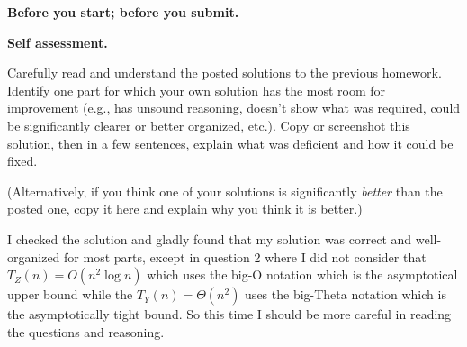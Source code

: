\documentclass[11pt,addpoints]{exam}
\begin{document}
\listoffixmes

\hwpreface

\pointsinmargin
{}
\marginpointname{ \points}
\marginbonuspointname{ \bonuspoints}

\begin{questions}
  \addtocounter{question}{-1}
  \question[0] \textbf{Before you start; before you submit.}
  

  \question[10] \textbf{Self assessment.}

  Carefully read and understand the posted solutions to the previous homework.
  Identify one part for which your own solution has the most room for improvement (e.g., has unsound reasoning, doesn’t show what was required, could be significantly clearer or better organized, etc.).
  Copy or screenshot this solution, then in a few sentences, explain what was deficient and how it could be fixed.

  (Alternatively, if you think one of your solutions is significantly \emph{better} than the posted one, copy it here and explain why you think it is better.)

  \begin{solution}
      I checked the solution and gladly found that my solution was correct and well-organized for most parts, except in question 2 where I did not consider that \(T_Z(n) = O(n^2 \log n)\) which uses the big-O notation which is the asymptotical upper bound while the \(T_Y(n) = \Theta(n^2)\) uses the big-Theta notation which is the asymptotically tight bound. So this time I should be more careful in reading the questions and reasoning.
  \end{solution}
    

\end{questions}
\end{document}
